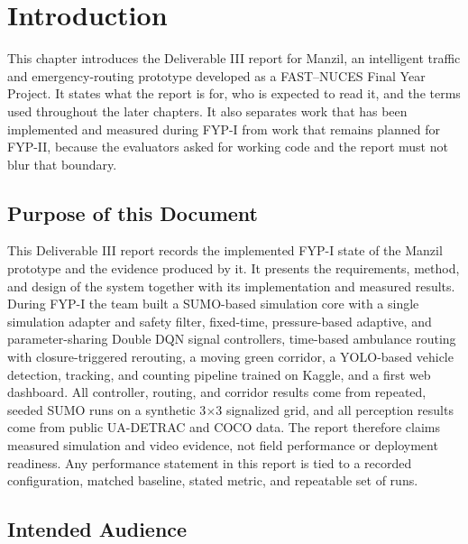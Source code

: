 \chapter{Introduction}
\label{ch:introduction}

This chapter introduces the Deliverable III report for Manzil, an intelligent traffic and emergency-routing prototype developed as a FAST--NUCES Final Year Project. It states what the report is for, who is expected to read it, and the terms used throughout the later chapters. It also separates work that has been implemented and measured during FYP-I from work that remains planned for FYP-II, because the evaluators asked for working code and the report must not blur that boundary.

\section{Purpose of this Document}

This Deliverable III report records the implemented FYP-I state of the Manzil prototype and the evidence produced by it. It presents the requirements, method, and design of the system together with its implementation and measured results. During FYP-I the team built a SUMO-based simulation core with a single simulation adapter and safety filter, fixed-time, pressure-based adaptive, and parameter-sharing Double DQN signal controllers, time-based ambulance routing with closure-triggered rerouting, a moving green corridor, a YOLO-based vehicle detection, tracking, and counting pipeline trained on Kaggle, and a first web dashboard. All controller, routing, and corridor results come from repeated, seeded SUMO runs on a synthetic 3$\times$3 signalized grid, and all perception results come from public UA-DETRAC and COCO data. The report therefore claims measured simulation and video evidence, not field performance or deployment readiness. Any performance statement in this report is tied to a recorded configuration, matched baseline, stated metric, and repeatable set of runs.

\section{Intended Audience}

